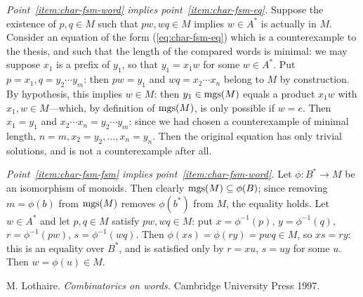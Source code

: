 \documentclass[12pt]{article}
\begin{document}
\emph{Point~\ref{item:char-fsm-word} implies point~\ref{item:char-fsm-eq}.}
Suppose the existence of $p,q\in M$ such that $pw,wq\in M$
implies $w\in A^\ast$ is actually in $M$.
Consider an equation of the form (\ref{eq:char-fsm-eq})
which is a counterexample to the thesis,
and such that the length of the compared words is minimal:
we may suppose $x_1$ is a prefix of $y_1$,
so that $y_1=x_1w$ for some $w\in A^\ast$.
Put $p=x_1,q=y_2\cdots y_m$:
then $pw=y_1$ and $wq=x_2\cdots x_n$ belong to $M$ by construction.
By hypothesis, this implies $w\in M$:
then $y_1\in\mathrm{mgs}(M)$ equals a product $x_1w$ with $x_1,w\in M$---which,
by definition of $\mathrm{mgs}(M)$,
is only possible if $w=e$.
Then $x_1=y_1$ and $x_2\cdots x_n=y_2\cdots y_m$:
since we had chosen a counterexample of minimal length,
$n=m,x_2=y_2,\ldots,x_n=y_n$.
Then the original equation has only trivial solutions,
and is not a counterexample after all.

\emph{Point~\ref{item:char-fsm-fsm} implies point~\ref{item:char-fsm-word}.}
Let $\phi:B^\ast\to M$ be an isomorphism of monoids.
Then clearly $\mathrm{mgs}(M)\subseteq\phi(B)$;
since removing $m=\phi(b)$ from $\mathrm{mgs}(M)$ removes $\phi(b^\ast)$ from $M$,
the equality holds.
Let $w\in A^\ast$ and let $p,q\in M$ satisfy $pw,wq\in M$:
put $x=\phi^{-1}(p)$, $y=\phi^{-1}(q)$,
$r=\phi^{-1}(pw)$, $s=\phi^{-1}(wq)$.
Then $\phi(xs)=\phi(ry)=pwq\in M$, so $xs=ry$:
this is an equality over $B^\ast$,
and is satisfied only by $r=xu$, $s=uy$ for some $u$.
Then $w=\phi(u)\in M$.

\begin{thebibliography}{99}

M. Lothaire.
\textit{Combinatorics on words.}
Cambridge University Press 1997.

\end{thebibliography}

\end{document}
